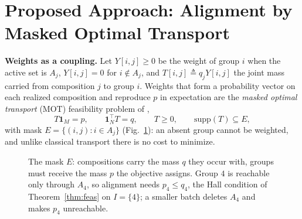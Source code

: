 \section{Proposed Approach: Alignment by Masked Optimal Transport}
\label{sec:gavot}

\noindent\textbf{Weights as a coupling.}
Let $Y[i,j]\ge 0$ be the weight of group $i$ when the active set is $A_j$,
$Y[i,j]=0$ for $i\notin A_j$, and $T[i,j]\triangleq q_jY[i,j]$ the joint
mass carried from composition $j$ to group $i$. Weights that form a probability vector on each realized composition and
reproduce $p$ in expectation are the \emph{masked optimal transport} (MOT)
feasibility problem of \cite{rahimi2025fedavot},
\begin{equation}
T\mathbf{1}_M=p,\qquad \mathbf{1}_N^\top T=q,\qquad T\ge 0,
\qquad \mathrm{supp}(T)\subseteq E,
\label{eq:mot}
\end{equation}
with mask $E=\{(i,j): i\in A_j\}$ (Fig.~\ref{fig:mask}): an absent group
cannot be weighted, and unlike classical transport
\cite{villani2009,peyre2019} there is no cost to minimize.

\begin{figure}[t]
\centering
{}
\caption{The mask $E$: compositions carry the mass $q$ they occur with, groups
must receive the mass $p$ the objective assigns. Group $4$ is reachable only
through $A_4$, so alignment needs $p_4\le q_4$, the Hall condition of
Theorem~\ref{thm:feas} on $I=\{4\}$; a smaller batch deletes $A_4$ and makes
$p_4$ unreachable.}
\label{fig:mask}
\end{figure}

